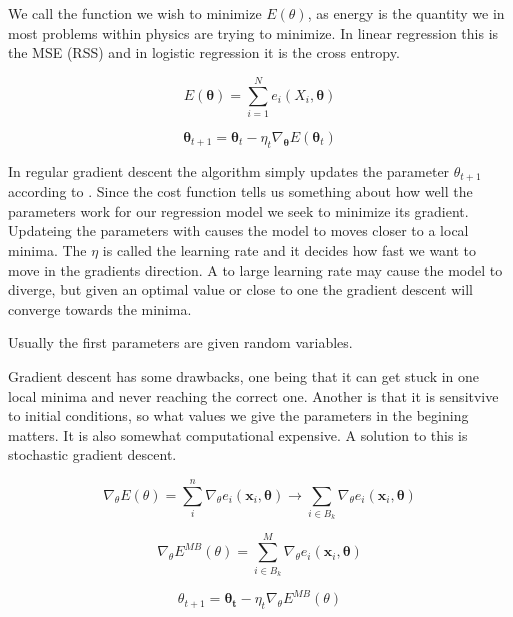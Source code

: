 We call the function we wish to minimize $E(\theta)$, as energy is the quantity we in most problems within physics are trying to minimize. In linear regression this is the MSE (RSS) and in logistic regression it is the cross entropy. 

\begin{equation}
E(\mathbf{\theta}) = \sum_{i=1}^N e_i(X_i, \mathbf{\theta}) 
\end{equation}

\begin{equation} \label{eq:theta}
\mathbf{\theta}_{t+1} = \mathbf{\theta}_t - \eta_t \nabla_{\mathbf{\theta}} E(\mathbf{\theta}_t)
\end{equation}

In regular gradient descent the algorithm simply updates the parameter $\theta_{t+1}$ according to . Since the cost function tells us something about how well the parameters work for our regression model we seek to minimize its gradient. Updateing the parameters with  causes the model to moves closer to a local minima. The $\eta$ is called the learning rate and it decides how fast we want to move in the gradients direction. A to large learning rate may cause the model to diverge, but given an optimal value or close to one the gradient descent will converge towards the minima.  

Usually the first parameters are given random variables. 

Gradient descent has some drawbacks, one being that it can get stuck in one local minima and never reaching the correct one. Another is that it is sensitvive to initial conditions, so what values we give the parameters in the begining matters. It is also somewhat computational expensive. A solution to this is stochastic gradient descent.  

\begin{equation}
\nabla_{\theta} E(\theta) = \sum_i^n \nabla_{\theta} e_i(\mathbf{x}_i, \mathbf{\theta}) \longrightarrow \sum_{i \in B_k} \nabla_{\theta} e_i(\mathbf{x}_i, \mathbf{\theta})
\end{equation}

\begin{equation}
\nabla_{\theta} E^{MB} (\theta) = \sum_{i \in B_k}^M \nabla_{\theta} e_i(\mathbf{x}_i, \mathbf{\theta})
\end{equation}

\begin{equation} \label{theta_sgd}
\theta_{t+1} = \mathbf{\theta_t} - \eta_t \nabla_{\theta} E^{MB} (\theta)
\end{equation}

